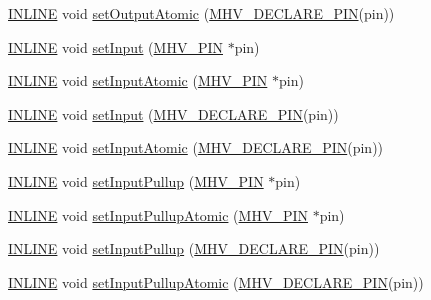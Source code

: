\begin{DoxyCompactItemize}
\item 
\hyperlink{io_8h_a2eb6f9e0395b47b8d5e3eeae4fe0c116}{I\-N\-L\-I\-N\-E} void \hyperlink{namespacemhvlib_a27c204c16bbdc76a443f122005ec2d10}{set\-Output\-Atomic} (\hyperlink{io_8h_afb172d17be3890bb07e5ceec5a014b91}{M\-H\-V\-\_\-\-D\-E\-C\-L\-A\-R\-E\-\_\-\-P\-I\-N}(pin))
\item 
\hyperlink{io_8h_a2eb6f9e0395b47b8d5e3eeae4fe0c116}{I\-N\-L\-I\-N\-E} void \hyperlink{namespacemhvlib_aa0ed067ba23f41fd0fda97c66ee432a4}{set\-Input} (\hyperlink{namespacemhvlib_a3fc44352ee2826fe480452ba1acd5de7}{M\-H\-V\-\_\-\-P\-I\-N} $\ast$pin)
\item 
\hyperlink{io_8h_a2eb6f9e0395b47b8d5e3eeae4fe0c116}{I\-N\-L\-I\-N\-E} void \hyperlink{namespacemhvlib_a9f71562d01298486bd79e167428bf910}{set\-Input\-Atomic} (\hyperlink{namespacemhvlib_a3fc44352ee2826fe480452ba1acd5de7}{M\-H\-V\-\_\-\-P\-I\-N} $\ast$pin)
\item 
\hyperlink{io_8h_a2eb6f9e0395b47b8d5e3eeae4fe0c116}{I\-N\-L\-I\-N\-E} void \hyperlink{namespacemhvlib_a438841f41a3107688f2727a993d1a708}{set\-Input} (\hyperlink{io_8h_afb172d17be3890bb07e5ceec5a014b91}{M\-H\-V\-\_\-\-D\-E\-C\-L\-A\-R\-E\-\_\-\-P\-I\-N}(pin))
\item 
\hyperlink{io_8h_a2eb6f9e0395b47b8d5e3eeae4fe0c116}{I\-N\-L\-I\-N\-E} void \hyperlink{namespacemhvlib_a138ded2de6bb394c5989d73d61b3e2f3}{set\-Input\-Atomic} (\hyperlink{io_8h_afb172d17be3890bb07e5ceec5a014b91}{M\-H\-V\-\_\-\-D\-E\-C\-L\-A\-R\-E\-\_\-\-P\-I\-N}(pin))
\item 
\hyperlink{io_8h_a2eb6f9e0395b47b8d5e3eeae4fe0c116}{I\-N\-L\-I\-N\-E} void \hyperlink{namespacemhvlib_a34c9b2e3555b4ffa80531ddd19188262}{set\-Input\-Pullup} (\hyperlink{namespacemhvlib_a3fc44352ee2826fe480452ba1acd5de7}{M\-H\-V\-\_\-\-P\-I\-N} $\ast$pin)
\item 
\hyperlink{io_8h_a2eb6f9e0395b47b8d5e3eeae4fe0c116}{I\-N\-L\-I\-N\-E} void \hyperlink{namespacemhvlib_a7ceb896654ee992f8391ae86fcff8d08}{set\-Input\-Pullup\-Atomic} (\hyperlink{namespacemhvlib_a3fc44352ee2826fe480452ba1acd5de7}{M\-H\-V\-\_\-\-P\-I\-N} $\ast$pin)
\item 
\hyperlink{io_8h_a2eb6f9e0395b47b8d5e3eeae4fe0c116}{I\-N\-L\-I\-N\-E} void \hyperlink{namespacemhvlib_ab9c16b3a102ec9ed8daa083fba2e5499}{set\-Input\-Pullup} (\hyperlink{io_8h_afb172d17be3890bb07e5ceec5a014b91}{M\-H\-V\-\_\-\-D\-E\-C\-L\-A\-R\-E\-\_\-\-P\-I\-N}(pin))
\item 
\hyperlink{io_8h_a2eb6f9e0395b47b8d5e3eeae4fe0c116}{I\-N\-L\-I\-N\-E} void \hyperlink{namespacemhvlib_aa144dafeae6d776b114c614ca51e0480}{set\-Input\-Pullup\-Atomic} (\hyperlink{io_8h_afb172d17be3890bb07e5ceec5a014b91}{M\-H\-V\-\_\-\-D\-E\-C\-L\-A\-R\-E\-\_\-\-P\-I\-N}(pin))

\end{DoxyCompactItemize}
